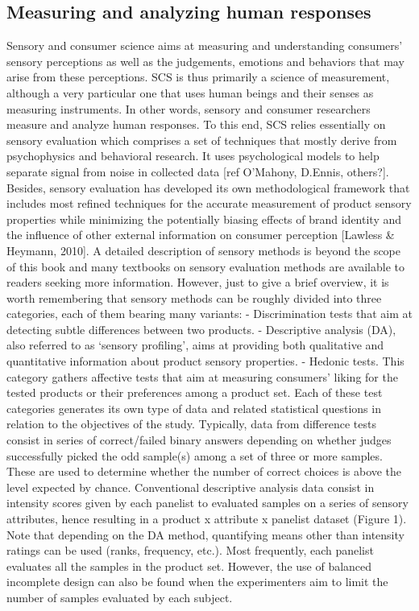 \documentclass[
]{book}
\begin{document}
\hypertarget{measuring-and-analyzing-human-responses}{%
\subsection{Measuring and analyzing human responses}\label{measuring-and-analyzing-human-responses}}

Sensory and consumer science aims at measuring and understanding consumers' sensory perceptions as well as the judgements, emotions and behaviors that may arise from these perceptions. SCS is thus primarily a science of measurement, although a very particular one that uses human beings and their senses as measuring instruments. In other words, sensory and consumer researchers measure and analyze human responses.
To this end, SCS relies essentially on sensory evaluation which comprises a set of techniques that mostly derive from psychophysics and behavioral research. It uses psychological models to help separate signal from noise in collected data {[}ref O'Mahony, D.Ennis, others?{]}. Besides, sensory evaluation has developed its own methodological framework that includes most refined techniques for the accurate measurement of product sensory properties while minimizing the potentially biasing effects of brand identity and the influence of other external information on consumer perception {[}Lawless \& Heymann, 2010{]}.
A detailed description of sensory methods is beyond the scope of this book and many textbooks on sensory evaluation methods are available to readers seeking more information. However, just to give a brief overview, it is worth remembering that sensory methods can be roughly divided into three categories, each of them bearing many variants:
- Discrimination tests that aim at detecting subtle differences between two products.
- Descriptive analysis (DA), also referred to as `sensory profiling', aims at providing both qualitative and quantitative information about product sensory properties.
- Hedonic tests. This category gathers affective tests that aim at measuring consumers' liking for the tested products or their preferences among a product set.
Each of these test categories generates its own type of data and related statistical questions in relation to the objectives of the study. Typically, data from difference tests consist in series of correct/failed binary answers depending on whether judges successfully picked the odd sample(s) among a set of three or more samples. These are used to determine whether the number of correct choices is above the level expected by chance.
Conventional descriptive analysis data consist in intensity scores given by each panelist to evaluated samples on a series of sensory attributes, hence resulting in a product x attribute x panelist dataset (Figure 1). Note that depending on the DA method, quantifying means other than intensity ratings can be used (ranks, frequency, etc.). Most frequently, each panelist evaluates all the samples in the product set. However, the use of balanced incomplete design can also be found when the experimenters aim to limit the number of samples evaluated by each subject.
\end{document}
